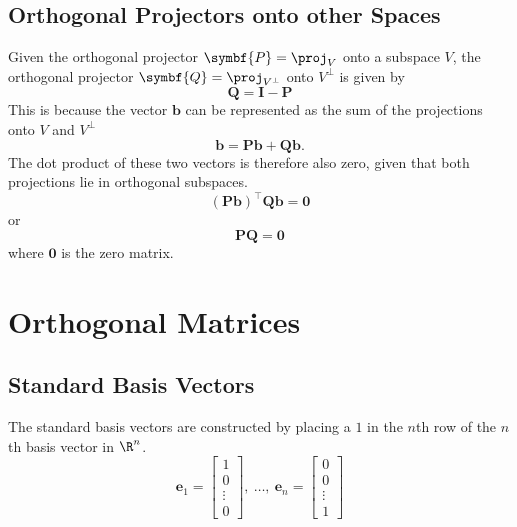 \documentclass{article}
\begin{document}
\subsection{Orthogonal Projectors onto other Spaces}
Given the orthogonal projector \(\symbf{P} = \proj_V\) onto a subspace
\(V\), the orthogonal projector \(\symbf{Q} = \proj_{V^\perp}\) onto
\(V^\perp\) is given by
\begin{equation*}
    \symbf{Q} = \symbf{I} - \symbf{P}
\end{equation*}
This is because the vector \(\symbf{b}\) can be represented as the
sum of the projections onto \(V\) and \(V^\perp\)
\begin{equation*}
    \symbf{b} = \symbf{P}\symbf{b} + \symbf{Q}\symbf{b}.
\end{equation*}
The dot product of these two vectors is therefore also zero, given that
both projections lie in orthogonal subspaces.
\begin{equation*}
    \left( \symbf{P}\symbf{b} \right)^\top \symbf{Q}\symbf{b} = \symbf{0}
\end{equation*}
or
\begin{equation*}
    \symbf{P} \symbf{Q} = \symbf{0}
\end{equation*}
where \(\symbf{0}\) is the zero matrix.
\section{Orthogonal Matrices}
\subsection{Standard Basis Vectors}
The standard basis vectors are constructed by placing a \(1\) in the
\(n\)th row of the \(n\)th basis vector in \(\R^n\).
\begin{equation*}
    \symbf{e}_1 =
    \begin{bmatrix}
        1      \\
        0      \\
        \vdots \\
        0
    \end{bmatrix}
    ,\: \dots,\: \symbf{e}_n =
    \begin{bmatrix}
        0      \\
        0      \\
        \vdots \\
        1
    \end{bmatrix}
\end{equation*}
\end{document}
